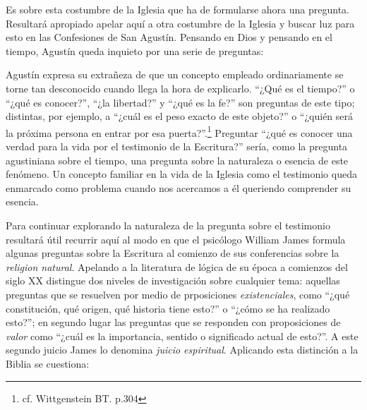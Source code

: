         Es sobre esta costumbre de la Iglesia que ha de formularse ahora una pregunta.
        Resultará apropiado apelar aquí a otra costumbre de la Iglesia y buscar luz para
        esto en las Confesiones de San Agustín. Pensando en Dios y pensando en el
        tiempo, Agustín queda inquieto por una serie de preguntas: 

        Agustín expresa su extrañeza de que un concepto empleado ordinariamente se
        torne tan desconocido cuando llega la hora de explicarlo. ``¿Qué es el
        tiempo?'' o ``¿qué es conocer?'', ``¿la libertad?'' y ``¿qué es la fe?'' son
        preguntas de este tipo; distintas, por ejemplo, a ``¿cuál es el peso exacto de
        este objeto?'' o ``¿quién será la próxima persona en entrar por esa
        puerta?''.\footnote{cf. Wittgenstein BT. p.304} Preguntar ``¿qué es conocer una
        verdad para la vida por el testimonio de la Escritura?'' sería, como la pregunta
        agustiniana sobre el tiempo, una pregunta sobre la naturaleza o esencia de
        este fenómeno. Un concepto familiar en la vida de la Iglesia como el
        testimonio queda enmarcado como problema cuando nos acercamos a él queriendo
        comprender su esencia.

        Para continuar explorando la naturaleza de la pregunta sobre el testimonio
        resultará útil recurrir aquí al modo en que el psicólogo William James formula
        algunas preguntas sobre la Escritura al comienzo de sus conferencias sobre la
        \emph{religion natural}. Apelando a la literatura de lógica de su época a
        comienzos del siglo XX distingue dos niveles de investigación sobre cualquier
        tema: aquellas preguntas que se resuelven por medio de prposiciones
        \emph{existenciales}, como ``¿qué constitución, qué origen, qué historia tiene
        esto?'' o ``¿cómo se ha realizado esto?''; en segundo lugar las preguntas que se
        responden con proposiciones de \emph{valor} como ``¿cuál es la importancia,
        sentido o significado actual de esto?''. A este segundo juicio James lo denomina
        \emph{juicio espiritual}. Aplicando esta distinción a la Biblia se cuestiona:

